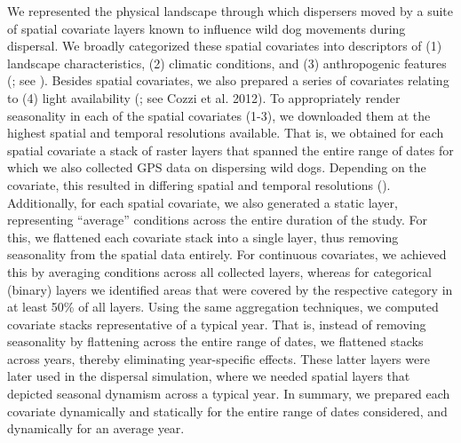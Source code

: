 \documentclass[../FinalThesis.tex]{subfiles}
\begin{document}
We represented the physical landscape through which dispersers moved by a suite
of spatial covariate layers known to influence wild dog movements during
dispersal. We broadly categorized these spatial covariates into descriptors of
(1) landscape characteristics, (2) climatic conditions, and (3) anthropogenic
features (; see \citealp{Hofmann.2021, Hofmann.2023}).
Besides spatial covariates, we also prepared a series of covariates relating to
(4) light availability (; see Cozzi et al. 2012). To
appropriately render seasonality in each of the spatial covariates (1-3), we
downloaded them at the highest spatial and temporal resolutions available. That
is, we obtained for each spatial covariate a stack of raster layers that spanned
the entire range of dates for which we also collected GPS data on dispersing
wild dogs. Depending on the covariate, this resulted in differing spatial and
temporal resolutions (). Additionally, for each spatial
covariate, we also generated a static layer, representing ``average'' conditions
across the entire duration of the study. For this, we flattened each covariate
stack into a single layer, thus removing seasonality from the spatial data
entirely. For continuous covariates, we achieved this by averaging conditions
across all collected layers, whereas for categorical (binary) layers we
identified areas that were covered by the respective category in at least 50\%
of all layers. Using the same aggregation techniques, we computed covariate
stacks representative of a typical year. That is, instead of removing
seasonality by flattening across the entire range of dates, we flattened stacks
across years, thereby eliminating year-specific effects. These latter layers
were later used in the dispersal simulation, where we needed spatial layers that
depicted seasonal dynamism across a typical year. In summary, we prepared each
covariate dynamically and statically for the entire range of dates considered,
and dynamically for an average year.
\end{document}

